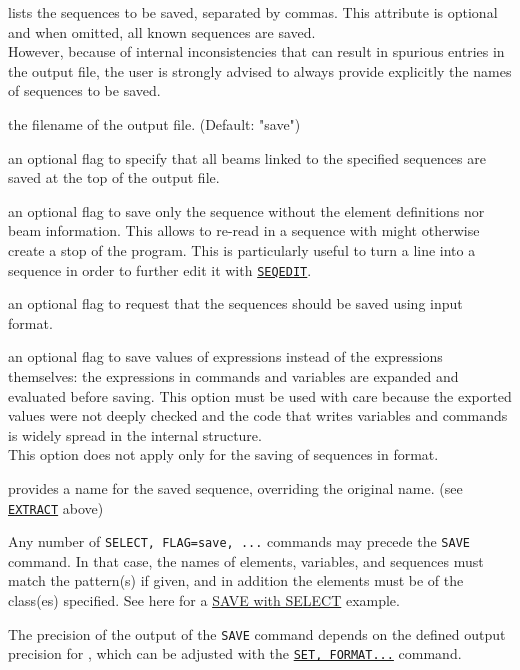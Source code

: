 \begin{5.03.00}
\begin{madlist}
	 lists the sequences to be saved, separated by commas. 
	This attribute is optional and when omitted, all known 
	sequences are saved. \\
	However, because of internal inconsistencies that can result in spurious 
	entries in the output file, the user is strongly advised to always provide 
	explicitly the names of sequences to be saved.

	 the filename of the output file. (Default: "save")

	 an optional flag to specify that all beams linked to the
	specified sequences are saved at the top of the output file.

	 an optional flag to save only the sequence without the
	element definitions nor beam information. This allows to re-read in a
	sequence with might otherwise create a stop of the program. This is
	particularly useful to turn a line into a sequence in order to further edit 
	it with \hyperref[sec:seqedit]{\tt SEQEDIT}.

	 an optional flag to request that the sequences should be  
	saved using \madeight input format.

	 an optional flag to save values of expressions 
	instead of the expressions themselves: the expressions in commands 
	and variables are expanded and evaluated before saving.
	This option must be used with care because the exported values were not deeply
	checked and the code that writes variables and commands is widely spread
	in the internal structure. \\
	This option does not apply only for the saving of sequences in \madeight format. 

	 provides a name for the saved sequence, overriding the 
	original name. (see \hyperref[sec:extract]{\tt EXTRACT} above)
\end{madlist}
\end{5.03.00}


Any number of {\tt SELECT, FLAG=save, ...} commands may precede
the {\tt SAVE} command. In that case, the names of elements, variables, and
sequences must match the pattern(s) if given, and in addition the
elements must be of the class(es) specified. 
See here for a
\href{../Introduction/select.html#save_select}{SAVE with SELECT}
example.  

The precision of the output of the {\tt SAVE} command depends on the defined 
output precision for \madx, which can be adjusted with the 
\hyperref[sec:set]{\tt SET, FORMAT...} command.

